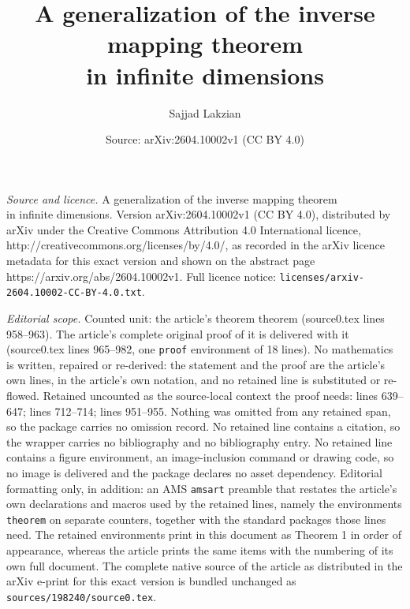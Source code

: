 \documentclass[10pt,a4paper]{amsart}
\title{\small A generalization of the inverse mapping theorem \\ \small in infinite dimensions}
\author{Sajjad Lakzian}
\date{Source: arXiv:2604.10002v1 (CC BY 4.0)}
\begin{document}
\maketitle

\noindent\emph{Source and licence.} \small A generalization of the inverse mapping theorem \\ \small in infinite dimensions. Version arXiv:2604.10002v1 (CC BY 4.0), distributed by arXiv under the Creative Commons Attribution 4.0 International licence, http://creativecommons.org/licenses/by/4.0/, as recorded in the arXiv licence metadata for this exact version and shown on the abstract page https://arxiv.org/abs/2604.10002v1. Full licence notice: \texttt{licenses/arxiv-2604.10002-CC-BY-4.0.txt}.\par\smallskip

\noindent\textit{Editorial scope.} Counted unit: the article's theorem theorem (source0.tex lines 958--963). The article's complete original proof of it is delivered with it (source0.tex lines 965--982, one \texttt{proof} environment of 18 lines). No mathematics is written, repaired or re-derived: the statement and the proof are the article's own lines, in the article's own notation, and no retained line is substituted or re-flowed.  Retained uncounted as the source-local context the proof needs: lines 639--647; lines 712--714; lines 951--955.  Nothing was omitted from any retained span, so the package carries no omission record.  No retained line contains a citation, so the wrapper carries no bibliography and no bibliography entry.  No retained line contains a figure environment, an image-inclusion command or drawing code, so no image is delivered and the package declares no asset dependency.  Editorial formatting only, in addition: an AMS \texttt{amsart} preamble that restates the article's own declarations and macros used by the retained lines, namely the environments \texttt{theorem} on separate counters, together with the standard packages those lines need.  The retained environments print in this document as Theorem 1 in order of appearance, whereas the article prints the same items with the numbering of its own full document.  The complete native source of the article as distributed in the arXiv e-print for this exact version is bundled unchanged as \texttt{sources/198240/source0.tex}.
\end{document}
